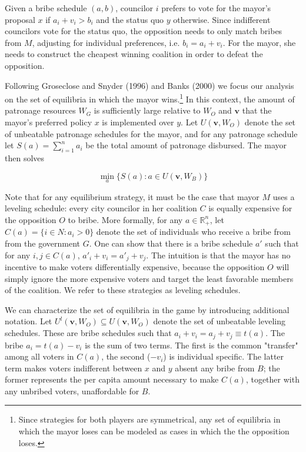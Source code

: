 \documentclass[12pt,a4paper]{article}
\newcommand{\bfv}{\mathbf{v}}
\begin{document}
Given a bribe schedule $(a, b)$, councilor $i$ prefers to vote for the mayor's proposal $x$ if $a_i + v_i > b_i$ and the status quo $y$ otherwise. Since indifferent councilors vote for the status quo, the opposition needs to only match bribes from $M$, adjusting for individual preferences, i.e. $b_i = a_i + v_i$. For the mayor, she needs to construct the cheapest winning coalition in order to defeat the opposition. 

Following Groseclose and Snyder (1996) and Banks (2000) we focus our analysis on the set of equilibria in which the mayor wins.\footnote{Since strategies for both players are symmetrical, any set of equilibria in which the mayor loses can be modeled as cases in which the the opposition loses.} In this context, the amount of patronage resources $W_G$ is sufficiently large relative to $W_O$ and $\bfv$ that the mayor's preferred policy $x$ is implemented over $y$. Let $U(\bfv, W_O)$ denote the set of unbeatable patronage schedules for the mayor, and for any patronage schedule let $S(a) = \sum_{i = 1}^n a_i$ be the total amount of patronage disbursed. The mayor then solves

\begin{equation}
    \label{eqn:solution}
    \min_a\{S(a) : a \in U(\mathbf{v}, W_B) \}
\end{equation}

Note that for any equilibrium strategy, it must be the case that mayor $M$ uses a leveling schedule: every city councilor in her coalition $C$ is equally expensive for the opposition $O$ to bribe. More formally, for any $a \in \mathbb{R}_+^n$, let $C(a) = \{i \in N : a_i > 0\}$ denote the set of individuals who receive a bribe from from the government $G$. One can show that there is a bribe schedule $a'$ such that for any $i,j \in C(a)$, $a'_i + v_i = a'_j + v_j$. The intuition is that the mayor has no incentive to make voters differentially expensive, because the opposition $O$ will simply ignore the more expensive voters and target the least favorable members of the coalition. We refer to these strategies as leveling schedules.

We can characterize the set of equilibria in the game by introducing additional notation. Let $U^l(\mathbf{v}, W_O) \subseteq U(\mathbf{v}, W_O)$ denote the set of unbeatable leveling schedules. These are bribe schedules such that $a_i + v_i = a_j + v_j  \equiv t(a)$. The bribe $a_i = t(a) - v_i$ is the sum of two terms. The first is the common "transfer" among all voters in $C(a)$, the second ($-v_i$) is individual specific. The latter term makes voters indifferent between $x$ and $y$ absent any bribe from $B$; the former represents the per capita amount necessary to make $C(a)$, together with any unbribed voters, unaffordable for $B$.
\end{document}
